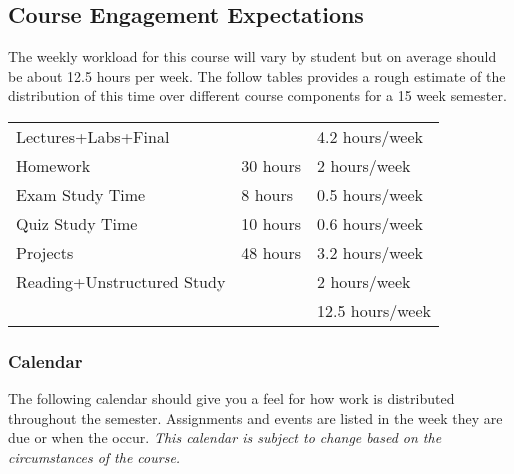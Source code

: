 \documentclass[10pt]{article}
\begin{document}
\subsection{Course Engagement Expectations}

The weekly workload for this course will vary by student but on average should be about 12.5 hours per week.  The follow tables provides a rough estimate of the distribution of this time over different course components for a 15 week semester. 
\begin{center}
\begin{tabular}{|l|l|l|}
\hline
Lectures+Labs+Final &      & 4.2 hours/week \\ 
Homework & 30 hours        & 2 hours/week \\
Exam Study Time & 8 hours  & 0.5 hours/week \\ 
Quiz Study Time & 10 hours & 0.6 hours/week \\
Projects & 48 hours        & 3.2 hours/week \\
Reading+Unstructured Study & & 2 hours/week \\
\hline
& & 12.5 hours/week \\ 
\hline
\end{tabular}
\end{center}

\subsubsection{Calendar}

The following calendar should give you a feel for how work is distributed throughout the semester.  Assignments and events are listed in the week they are due or when the occur. \textit{This calendar is subject to change based on the circumstances of the course.}
\end{document}
